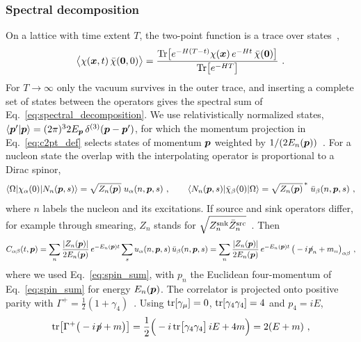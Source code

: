 \subsubsection{Spectral decomposition}
On a lattice with time extent $T$, the two-point function is a trace over states~\cite{Lin:2014},
\begin{equation}
    \big\langle\chi(\boldsymbol{x},t)\,\bar\chi(\boldsymbol{0},0)\big\rangle=\frac{\mathrm{Tr}\big[e^{-H(T-t)}\chi(\boldsymbol{x})\,e^{-Ht}\,\bar\chi(\boldsymbol{0})\big]}{\mathrm{Tr}\big[e^{-HT}\big]} \ .
    \label{eq:c2pt_transfer}
\end{equation}
For $T\to\infty$ only the vacuum survives in the outer trace, and inserting a complete set of states between the operators gives the spectral sum of Eq.~\eqref{eq:spectral_decomposition}. We use relativistically normalized states, $\langle\boldsymbol{p}'|\boldsymbol{p}\rangle=(2\pi)^32E_{\boldsymbol{p}}\,\delta^{(3)}(\boldsymbol{p}-\boldsymbol{p}')$, for which the momentum projection in Eq.~\eqref{eq:c2pt_def} selects states of momentum $\boldsymbol{p}$ weighted by $1/(2E_n(\boldsymbol{p}))$~\cite{Lin:2014}. For a nucleon state the overlap with the interpolating operator is proportional to a Dirac spinor,
\begin{equation}
    \langle\Omega|\chi_\alpha(0)|N_n(\boldsymbol{p},s)\rangle=\sqrt{Z_n(\boldsymbol{p})}\;u_\alpha(n,\boldsymbol{p},s) \ , \qquad
    \langle N_n(\boldsymbol{p},s)|\bar\chi_\beta(0)|\Omega\rangle=\sqrt{Z_n(\boldsymbol{p})}^{\,*}\;\bar u_\beta(n,\boldsymbol{p},s) \ ,
    \label{eq:overlap}
\end{equation}
where $n$ labels the nucleon and its excitations. If source and sink operators differ, for example through smearing, $Z_n$ stands for $\sqrt{Z^{\rm snk}_n\bar Z^{\rm src}_n}$~\cite{Lin:2014}. Then
\begingroup\small
\begin{equation}
    C_{\alpha\beta}(t,\boldsymbol{p})=\sum_n\frac{|Z_n(\boldsymbol{p})|}{2E_n(\boldsymbol{p})}\,e^{-E_n(\boldsymbol{p})t}\sum_s u_\alpha(n,\boldsymbol{p},s)\,\bar u_\beta(n,\boldsymbol{p},s)
    =\sum_n\frac{|Z_n(\boldsymbol{p})|}{2E_n(\boldsymbol{p})}\,e^{-E_n(\boldsymbol{p})t}\,\big(-i{\not\!p}_n+m_n\big)_{\alpha\beta} \ ,
    \label{eq:c2pt_spectral}
\end{equation}
\endgroup
where we used Eq.~\eqref{eq:spin_sum}, with $p_n$ the Euclidean four-momentum of Eq.~\eqref{eq:spin_sum} for energy $E_n(\boldsymbol{p})$. The correlator is projected onto positive parity with $\Gamma^+=\frac12(1+\gamma_4)$~\cite{Gattringer:2010zz}. Using $\mathrm{tr}[\gamma_\mu]=0$, $\mathrm{tr}[\gamma_4\gamma_4]=4$ and $p_4=iE$,
\begin{equation}
    \mathrm{tr}\big[\Gamma^+\big(-i{\not\!p}+m\big)\big]=\frac12\Big(-i\,\mathrm{tr}\big[\gamma_4\gamma_4\big]\,iE+4m\Big)=2(E+m) \ ,
    \label{eq:c2pt_trace}
\end{equation}

